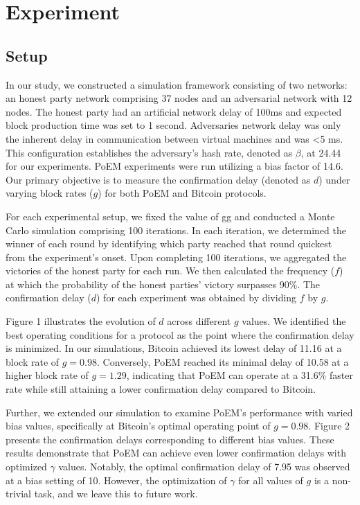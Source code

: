 \section{Experiment}

\subsection{Setup}

In our study, we constructed a simulation framework consisting of two networks:
an honest party network comprising 37 nodes and an adversarial network with 12
nodes. The honest party had an artificial network delay of 100ms and
expected block production time was set to 1 second. Adversaries network delay
was only the inherent delay in communication between virtual machines and was
<5 ms. This configuration establishes the adversary's hash rate, denoted as
$\beta$, at 24.44 for our experiments. PoEM experiments were run utilizing a
bias factor of 14.6. Our primary objective is to measure the confirmation delay
(denoted as $d$) under varying block rates ($g$) for both PoEM and Bitcoin
protocols.

For each experimental setup, we fixed the value of gg and conducted a Monte
Carlo simulation comprising 100 iterations. In each iteration, we determined
the winner of each round by identifying which party reached that round quickest
from the experiment's onset. Upon completing 100 iterations, we aggregated the
victories of the honest party for each run. We then calculated the frequency
($f$) at which the probability of the honest parties' victory surpasses 90\%.
The confirmation delay ($d$) for each experiment was obtained by dividing $f$
by $g$.

Figure 1 illustrates the evolution of $d$ across different $g$ values. We
identified the best operating conditions for a protocol as the point where the
confirmation delay is minimized. In our simulations, Bitcoin achieved its
lowest delay of 11.16 at a block rate of $g=0.98$. Conversely, PoEM reached its
minimal delay of 10.58 at a higher block rate of $g=1.29$, indicating that PoEM
can operate at a 31.6\% faster rate while still attaining a lower confirmation
delay compared to Bitcoin.

Further, we extended our simulation to examine PoEM's performance with varied
bias values, specifically at Bitcoin's optimal operating point of $g=0.98$.
Figure 2 presents the confirmation delays corresponding to different bias
values. These results demonstrate that PoEM can achieve even lower confirmation
delays with optimized $\gamma$ values. Notably, the optimal confirmation delay
of 7.95 was observed at a bias setting of 10. However, the optimization of
$\gamma$ for all values of $g$ is a non-trivial task, and we leave this to
future work.

